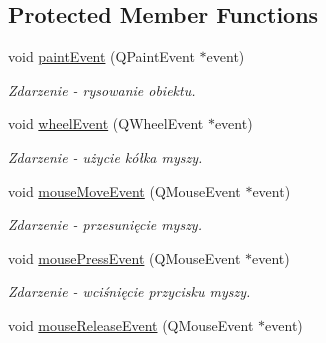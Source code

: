 \subsection*{Protected Member Functions}
\begin{DoxyCompactItemize}
\item 
\hypertarget{class_tree_view_aec03cf0f103de72879377ead28b71eeb}{
void \hyperlink{class_tree_view_aec03cf0f103de72879377ead28b71eeb}{paintEvent} (QPaintEvent $\ast$event)}
\label{class_tree_view_aec03cf0f103de72879377ead28b71eeb}

\begin{DoxyCompactList}\small\item\em Zdarzenie -\/ rysowanie obiektu. \item\end{DoxyCompactList}\item 
\hypertarget{class_tree_view_a658b8c7b25760033f2039358c4885ac7}{
void \hyperlink{class_tree_view_a658b8c7b25760033f2039358c4885ac7}{wheelEvent} (QWheelEvent $\ast$event)}
\label{class_tree_view_a658b8c7b25760033f2039358c4885ac7}

\begin{DoxyCompactList}\small\item\em Zdarzenie -\/ użycie kółka myszy. \item\end{DoxyCompactList}\item 
\hypertarget{class_tree_view_a424647d454ad86bed4c0bcb395859b06}{
void \hyperlink{class_tree_view_a424647d454ad86bed4c0bcb395859b06}{mouseMoveEvent} (QMouseEvent $\ast$event)}
\label{class_tree_view_a424647d454ad86bed4c0bcb395859b06}

\begin{DoxyCompactList}\small\item\em Zdarzenie -\/ przesunięcie myszy. \item\end{DoxyCompactList}\item 
\hypertarget{class_tree_view_a7af5eec8ccfd886bcfe83bd9777d3825}{
void \hyperlink{class_tree_view_a7af5eec8ccfd886bcfe83bd9777d3825}{mousePressEvent} (QMouseEvent $\ast$event)}
\label{class_tree_view_a7af5eec8ccfd886bcfe83bd9777d3825}

\begin{DoxyCompactList}\small\item\em Zdarzenie -\/ wciśnięcie przycisku myszy. \item\end{DoxyCompactList}\item 
\hypertarget{class_tree_view_ae368e9ae74eb41196ebf7b356bbce1d2}{
void \hyperlink{class_tree_view_ae368e9ae74eb41196ebf7b356bbce1d2}{mouseReleaseEvent} (QMouseEvent $\ast$event)}
\label{class_tree_view_ae368e9ae74eb41196ebf7b356bbce1d2}


\end{DoxyCompactItemize}
